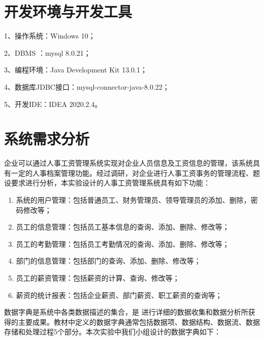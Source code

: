 \documentclass[withoutpreface,bwprint]{cumcmthesis} %
\begin{document}
\section{开发环境与开发工具}
1、操作系统：Windows 10；

2、DBMS ：mysql 8.0.21；

3、编程环境：Java Development Kit 13.0.1；

4、数据库JDBC接口：mysql-connector-java-8.0.22；

5、开发IDE：IDEA 2020.2.4。
\section{系统需求分析}

企业可以通过人事工资管理系统实现对企业人员信息及工资信息的管理，该系统具有一定的人事档案管理功能。经过调研，对企业进行人事工资事务的管理流程、题设要求进行分析，本实验设计的人事工资管理系统具有如下功能：
\begin{enumerate}
	\item 系统的用户管理：包括普通员工、财务管理员、领导管理员的添加、删除，密码修改等；
	\item 员工的信息管理：包括员工基本信息的查询、添加、删除、修改等；
	\item 员工的考勤管理：包括员工考勤情况的查询、添加、删除、修改等；
	\item 部门的信息管理：包括部门的查询、添加、删除、修改等；
	\item 员工的薪资管理：包括薪资的计算、查询、修改等；
	\item 薪资的统计报表：包括企业薪资、部门薪资、职工薪资的查询等；
\end{enumerate}

数据字典是系统中各类数据描述的集合，是
进行详细的数据收集和数据分析所获得的主要成果。教材中定义的数据字典通常包括数据项、数据结构、数据流、数据存储和处理过程5个部分。本次实验中我们小组设计的数据字典如下：
\end{document}
